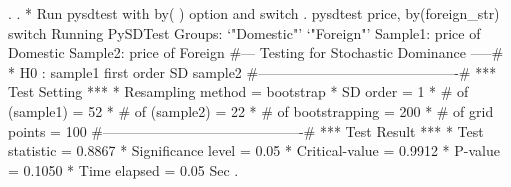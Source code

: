 . 
. * Run pysdtest with by( ) option and switch
. pysdtest price, by(foreign_str) switch
Running PySDTest
Groups:
`"Domestic"' `"Foreign"'
Sample1: price of Domestic
Sample2: price of Foreign
{\smallskip}
\#--- Testing for Stochastic Dominance  -----\#
{\smallskip}
* H0 : sample1 first order SD sample2
{\smallskip}
\#-------------------------------------------\#
{\smallskip}
*** Test Setting ***
* Resampling method      = bootstrap
* SD order               =      1
* \# of (sample1)         =     52 
* \# of (sample2)         =     22
* \# of bootstrapping     =    200
* \# of grid points       =    100
{\smallskip}
\#-------------------------------------------\#
{\smallskip}
*** Test Result ***
* Test statistic         = 0.8867
* Significance level     =  0.05
* Critical-value         = 0.9912
* P-value                = 0.1050
* Time elapsed           =  0.05 Sec
{\smallskip}
. 
